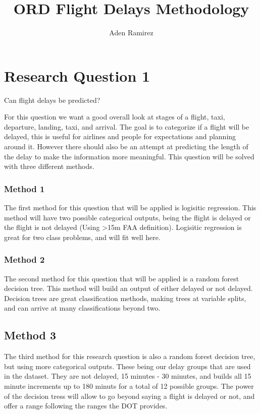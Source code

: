 \documentclass[a4paper,12pt]{article}
\begin{document}
\title{ORD Flight Delays Methodology}
\author{Aden Ramirez}
\maketitle

\pagebreak

\section{Research Question 1}
Can flight delays be predicted?

For this question we want a good overall look at stages of a flight, taxi, departure, landing, taxi, and arrival. The goal is to categorize if a flight will be delayed,
this is useful for airlines and people for expectations and planning around it. However there should also be an attempt at predicting the length of the delay to make 
the information more meaningful. This question will be solved with three different methods.

\subsubsection{Method 1}

The first method for this question that will be applied is logisitic regression. This method will have two possible categorical outputs, being the flight is delayed
or the flight is not delayed (Using >15m FAA definition). Logisitic regression is great for two class problems, and will fit well here.

\subsubsection{Method 2}
The second method for this question that will be applied is a random forest decision tree. This method will build an output of either delayed or not delayed. Decision trees
are great classification methods, making trees at variable splits, and can arrive at many classifications beyond two.

\subsection{Method 3}
The third method for this research question is also a random forest decision tree, but using more categorical outputs. These being our delay groups that are used in the dataset. They are not delayed, 15 minutes - 30 minutes, and builds all 15 minute increments
up to 180 minuts for a total of 12 possible groups. The power of the decision tress will allow to go beyond saying a flight is delayed or not, and offer a range following
the ranges the DOT provides.
\end{document}
